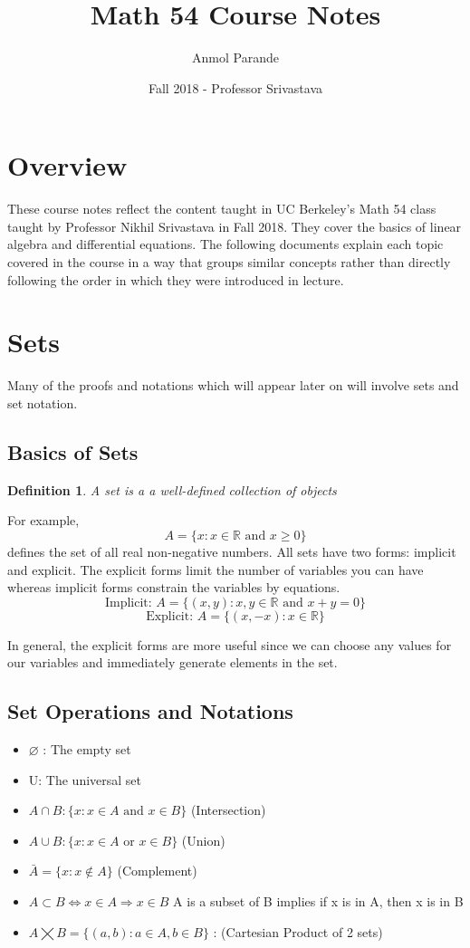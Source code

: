 \documentclass{article}
\newtheorem{definition}{Definition}
\begin{document}
    \title{Math 54 Course Notes}
    \author{Anmol Parande}
    \date{Fall 2018 - Professor Srivastava}
    \maketitle
    \section{Overview}
    These course notes reflect the content taught in UC Berkeley's Math 54 class taught by Professor Nikhil Srivastava in Fall 2018.
    They cover the basics of linear algebra and differential equations. The following documents explain each topic covered in the course in a way that groups similar concepts rather than directly following the order in which they were introduced in lecture.
    \section{Sets}
    Many of the proofs and notations which will appear later on will involve sets and set notation.
    \subsection{Basics of Sets}
    \begin{definition}
        A set is a a well-defined collection of objects
    \end{definition}
    For example, 
    $$A = \{x : x \in \mathbb{R} \text{ and } x \ge 0 \} $$
    defines the set of all real non-negative numbers.
    All sets have two forms: implicit and explicit. The explicit forms limit the number of variables you can have whereas implicit forms constrain the variables by equations.
    $$\text{Implicit: } A = \{ (x, y): x, y \in \mathbb{R} \text{ and } x+y=0 \}$$
    $$\text{Explicit: } A = \{ (x, -x): x \in \mathbb{R}\}$$

    In general, the explicit forms are more useful since we can choose any values for our variables and immediately generate elements in the set.

    \subsection[]{Set Operations and Notations}
    \begin{itemize}
        \item $\varnothing$ : The empty set
        \item U: The universal set
        \item $A \cap B: \{ x: x\in A \text{ and } x \in B \} $ (Intersection)
        \item $A \cup B: \{ x: x\in A \text{ or } x \in B \} $ (Union)
        \item $\bar{A} = \{ x:x \notin A \} $ (Complement)
        \item $A \subset B \Leftrightarrow x\in A \Rightarrow x \in B$ {A is a subset of B implies if x is in A, then x is in B}
        \item $ A \bigtimes B = \{(a, b): a\in A, b\in B\}$ : (Cartesian Product of 2 sets)
    \end{itemize}
    
\end{document}
